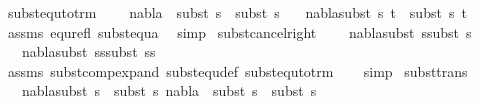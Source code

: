 \begin{isabellebody}
\endisatagproof
{\isafoldproof}%
%
\isadelimproof
\isanewline
%
\endisadelimproof
\isanewline
{}\isamarkupfalse%
\ subst{\isacharunderscore}{\kern0pt}equ{\isacharunderscore}{\kern0pt}to{\isacharunderscore}{\kern0pt}trm{\isacharcolon}{\kern0pt}\ \isanewline
\ \ \ {\isachardoublequoteopen}nabla\ {\isasymTurnstile}\ subst\ s{}\ {\isasymapprox}\ subst\ s{}{\isachardoublequoteclose}\isanewline
\ \ \ {\isachardoublequoteopen}nabla{\isasymturnstile}subst\ s{}\ t\ {\isasymapprox}\ subst\ s{}\ t{\isachardoublequoteclose}\isanewline
%
\isadelimproof
\ \ %
\endisadelimproof
%
\isatagproof
{}\isamarkupfalse%
\ assms\ equ{\isacharunderscore}{\kern0pt}refl\ subst{\isacharunderscore}{\kern0pt}equ{\isacharunderscore}{\kern0pt}a\ \isamarkupfalse%
\ simp%
\endisatagproof
{\isafoldproof}%
%
\isadelimproof
\isanewline
%
\endisadelimproof
\isanewline
{}\isamarkupfalse%
\ subst{\isacharunderscore}{\kern0pt}cancel{\isacharunderscore}{\kern0pt}right{\isacharcolon}{\kern0pt}\ \isanewline
\ \ \ {\isachardoublequoteopen}nabla{\isasymTurnstile}{\isacharparenleft}{\kern0pt}subst\ s{}{\isacharparenright}{\kern0pt}{\isasymapprox}{\isacharparenleft}{\kern0pt}subst\ s{}{\isacharparenright}{\kern0pt}{\isachardoublequoteclose}\isanewline
\ \ \ {\isachardoublequoteopen}nabla{\isasymTurnstile}{\isacharparenleft}{\kern0pt}subst\ {\isacharparenleft}{\kern0pt}s{}{\isasymbullet}s{\isacharparenright}{\kern0pt}{\isacharparenright}{\kern0pt}{\isasymapprox}{\isacharparenleft}{\kern0pt}subst\ {\isacharparenleft}{\kern0pt}s{}{\isasymbullet}s{\isacharparenright}{\kern0pt}{\isacharparenright}{\kern0pt}{\isachardoublequoteclose}\ \isanewline
%
\isadelimproof
\ \ %
\endisadelimproof
%
\isatagproof
{}\isamarkupfalse%
\ assms\ subst{\isacharunderscore}{\kern0pt}comp{\isacharunderscore}{\kern0pt}expand\ subst{\isacharunderscore}{\kern0pt}equ{\isacharunderscore}{\kern0pt}def\ subst{\isacharunderscore}{\kern0pt}equ{\isacharunderscore}{\kern0pt}to{\isacharunderscore}{\kern0pt}trm\isanewline
\ \ \isamarkupfalse%
\ simp%
\endisatagproof
{\isafoldproof}%
%
\isadelimproof
\isanewline
%
\endisadelimproof
\isanewline
{}\isamarkupfalse%
\ subst{\isacharunderscore}{\kern0pt}trans{\isacharcolon}{\kern0pt}\ \isanewline
\ \ \ {\isachardoublequoteopen}nabla{\isasymTurnstile}subst\ s{}\ {\isasymapprox}\ subst\ s{}{\isachardoublequoteclose}\ {\isachardoublequoteopen}nabla\ {\isasymTurnstile}\ subst\ s{}\ {\isasymapprox}\ subst\ s{}{\isachardoublequoteclose}\isanewline

\end{isabellebody}
